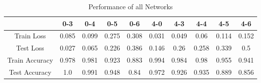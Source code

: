 \begin{table}
	\centering
	\caption{Performance of all Networks}
	\label{tab:network-performances}
	\begin{tabular}{c|c|c|c|c|c|c|c|c|c}
		& 0-3 & 0-4 & 0-5 & 0-6 & 4-0 & 4-3 & 4-4 & 4-5 & 4-6 \\ \hline
		Train Loss & 0.085 & 0.099 & 0.275 & 0.308 & 0.031 & 0.049 & 0.06 & 0.114 & 0.152 \\
		Test Loss & 0.027 & 0.065 & 0.226 & 0.386 & 0.146 & 0.26 & 0.258 & 0.339 & 0.5 \\ \hline
		Train Accuracy & 0.978 & 0.981 & 0.923 & 0.883 & 0.994 & 0.984 & 0.98 & 0.955 & 0.941 \\
		Test Accuracy & 1.0 & 0.991 & 0.948 & 0.84 & 0.972 & 0.926 & 0.935 & 0.889 & 0.856 \\
	\end{tabular}
\end{table}